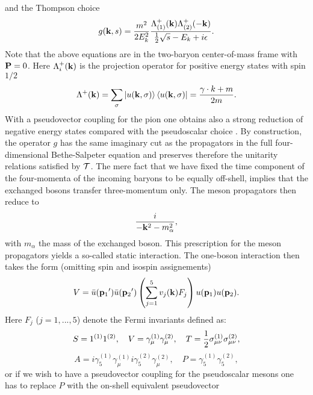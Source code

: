 and the Thompson choice
\begin{equation}
   g({\bf k},s)=\frac{m^2}{2E_k^2}
                \frac{\Lambda_{(1)}^+ ({\bf k})\Lambda_{(2)}^+ ({\bf -k})}
                {\frac{1}{2}\sqrt{s} -E_k +i\epsilon}.
   \label{gthomp}
\end{equation}
Note that the above equations are in the two-baryon center-of-mass frame with
${\bf P}=0$.
Here  $\Lambda_i^+ ({\bf k})$ is the projection operator for positive 
energy states with spin $1/2$
\begin{equation}
     \Lambda^+({\bf k})=
     \sum_{\sigma}\left| u({\bf k},\sigma) \right\rangle\left\langle u({\bf k},\sigma) \right|=
     \frac{\gamma\cdot k +m}{2m}.
\end{equation}
With a
pseudovector coupling
for the pion one obtains also a strong reduction of negative energy states compared
with the pseudoscalar choice \cite{zt81}.
By construction, the operator $g$ has the same
imaginary cut as the propagators in the full four-dimensional
Bethe-Salpeter equation and preserves therefore the unitarity relations
satisfied by ${\cal T}$.
The mere fact that we have fixed the time component of the four-momenta of
the incoming baryons to be equally off-shell, implies that
the exchanged bosons transfer three-momentum only. The meson propagators
then reduce  to
\begin{equation}
  \frac{i}{-{\bf k}^2-m_{\alpha}^2},
  \label{eq:mesprop}
\end{equation}
with $m_{\alpha}$ the mass of the exchanged boson.
This prescription for the meson propagators
yields a so-called static interaction.
The one-boson interaction then
takes the form (omitting spin and isospin
assignements)
\begin{equation}
   V=\bar u({\bf p}_1{'}) \bar u({\bf p}_2{'})
   \left(\sum_{j=1}^{5} v_j({\bf k})F_j\right) u({\bf p}_1)u({\bf p}_2).
   \label{eq:vobe}
\end{equation}
Here $F_j$ ($j=1,...,5$) denote the Fermi invariants
defined as:
\begin{equation}
S=1^{(1)}1^{(2)}, \quad V=\gamma_\mu^{(1)} \gamma_\mu^{(2)},\quad T={1\over2}
\sigma_{\mu \nu}^{(1)} \sigma_{\mu \nu}^{(2)},
\end{equation}
\begin{equation}
A=i\gamma_5^{(1)} \gamma_\mu^{(1)} i\gamma_5^{(2)} \gamma_\mu^{(2)},
\quad P=\gamma_5^{(1)} \gamma_5^{(2)},
\end{equation}
or if we wish to have a pseudovector coupling for the pseudoscalar mesons
one has to replace $P$ with the on-shell equivalent pseudovector
